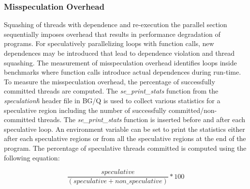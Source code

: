 \documentclass[10pt]{report}          %
\begin{document}
\subsubsection{Misspeculation Overhead}
\label{sec:mispeculation}
Squashing of threads with dependence and re-execution the parallel section sequentially imposes overhead that results in performance degradation of programs.  For speculatively parallelizing loops with function calls, new dependences may be introduced that lead to dependence violation and thread squashing.  The measurement of misspeculation overhead identifies loops inside benchmarks where function calls introduce actual dependences during run-time.\\
To measure the misspeculation overhead, the percentage of successfully committed threads are computed.  The \textit{se\_print\_stats} function from the \textit{speculation\.h} header file in BG/Q is used to collect various statistics for a speculative region including the number of successfully committed/non-committed threads.  The \textit{se\_print\_stats} function is inserted before and after each speculative loop.  An environment variable can be set to print the statistics either after each speculative regions or from all the speculative regions at the end of the program.  The percentage of speculative threads committed is computed using the following equation:

\begin{equation}
 \frac{speculative }{\left ( speculative + non\_speculative \right )}\ast 100
\end{equation}
\end{document}

